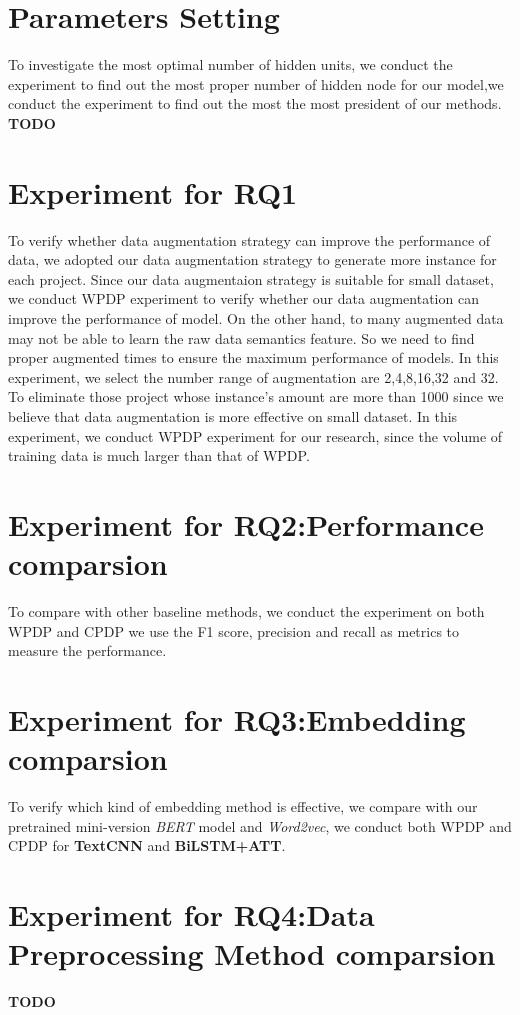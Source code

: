 \section{Parameters Setting}
To investigate the most optimal number of hidden units, we conduct the experiment to find out the most proper number of hidden node for our model,we conduct the experiment to find out the most the most president of our methods. \\
\textbf{TODO}

\section{Experiment for RQ1}
To verify whether data augmentation strategy can improve the performance of data, we adopted our data augmentation strategy to generate more instance for each project. Since our data augmentaion strategy is suitable for small dataset, we conduct WPDP experiment to verify whether our data augmentation can improve the performance of model. On the other hand, to many augmented data may not be able to learn the raw data semantics feature. So we need to find proper augmented times to ensure the maximum performance of models. In this experiment, we select the number range of augmentation are 2,4,8,16,32 and 32. To eliminate those project whose instance's amount are more than 1000 since we believe that data augmentation is more effective on small dataset. In this experiment, we conduct WPDP experiment for our research, since the volume of training data is much larger than that of WPDP.
\section{Experiment for RQ2:Performance comparsion}
To compare with other baseline methods, we conduct the experiment on both WPDP and CPDP we use the F1 score, precision and recall as metrics to measure the performance.
\section{Experiment for RQ3:Embedding comparsion}
To verify which kind of embedding method is effective, we compare with our pretrained mini-version \textit{BERT} model and \textit{Word2vec}, we conduct both WPDP and CPDP for \textbf{TextCNN} and \textbf{BiLSTM+ATT}. 
\section{Experiment for RQ4:Data Preprocessing Method comparsion}
\textbf{TODO}




